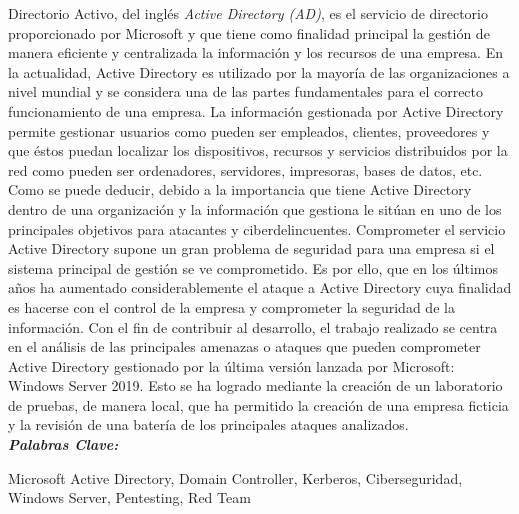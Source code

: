 
\setcounter{page}{5}
	

Directorio Activo, del inglés {\it Active Directory (AD)}, es el servicio de directorio proporcionado por Microsoft y que tiene como finalidad principal la gestión de manera eficiente y centralizada la información y los recursos de una empresa. En la actualidad, Active Directory es utilizado por la mayoría de las organizaciones a nivel mundial y se considera una de las partes fundamentales para el correcto funcionamiento de una empresa. La información gestionada por Active Directory permite gestionar usuarios como pueden ser empleados, clientes,  proveedores y que éstos puedan localizar los dispositivos, recursos y servicios distribuidos por la red como pueden ser ordenadores, servidores, impresoras, bases de datos, etc. Como se puede deducir, debido a la importancia que tiene Active Directory dentro de una organización y la información que gestiona le sitúan en uno de los principales objetivos para atacantes y ciberdelincuentes. Comprometer el servicio Active Directory supone un gran problema de seguridad para una empresa si el sistema principal de gestión se ve comprometido. Es por ello, que en los últimos años ha aumentado considerablemente el ataque a Active Directory cuya finalidad es hacerse con el control de la empresa y comprometer la seguridad de la información. Con el fin de contribuir al desarrollo, el trabajo realizado se centra en el análisis de las principales amenazas o ataques que pueden comprometer Active Directory gestionado por la última versión lanzada por Microsoft: Windows Server 2019. Esto se ha logrado mediante la creación de un laboratorio de pruebas, de manera local, que ha permitido la creación de una empresa ficticia y la revisión de una batería de los principales ataques analizados. \\

\textit{\textbf{Palabras Clave:}}

Microsoft Active Directory, Domain Controller, Kerberos, Ciberseguridad, Windows Server, Pentesting, Red Team
	
		
\vfill
\newpage %
\thispagestyle{empty}
\mbox{}

